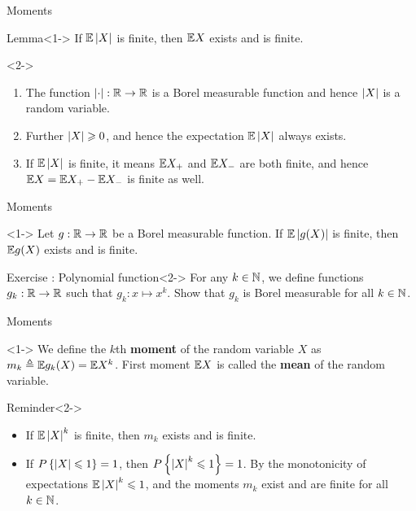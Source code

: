 \documentclass[12pt,aspectratio=169]{beamer}
\begin{document}
\begin{frame}{Moments}
\begin{block}{Lemma}<1->
If $\mathbb{E}\left\lvert X\right\rvert$ is finite, then $\mathbb{E} X$ exists and is finite. 
\end{block}
\begin{Proof}<2->
\begin{enumerate}
\item <2-> The function $\left\lvert\cdot\right\rvert: \mathbb{R} \to \mathbb{R}$ is a Borel measurable function and hence $\left\lvert X\right\rvert$ is a random variable. 
\item <3-> Further $\left\lvert X\right\rvert \geqslant 0$, and hence the expectation $\mathbb{E}\left\lvert X\right\rvert$ always exists. 
\item <4-> If $\mathbb{E}\left\lvert X\right\rvert$ is finite, it means $\mathbb{E} X_+$ and $\mathbb{E} X_-$ are both finite, 
and hence $\mathbb{E} X = \mathbb{E} X_+ - \mathbb{E} X_-$ is finite as well. 
\end{enumerate}
\end{Proof}
\end{frame}
\begin{frame}{Moments}
\begin{cor}<1->
Let $g: \mathbb{R} \to \mathbb{R}$ be a Borel measurable function. 
If $\mathbb{E}\left\lvert g(X)\right\rvert$ is finite, then $\mathbb{E} g(X)$ exists and is finite. 
\end{cor} 

\begin{block}{Exercise : Polynomial function}<2->
For any $k \in \mathbb{N}$, we define functions $g_k: \mathbb{R} \to \mathbb{R}$ such that $g_k: x \mapsto x^k$. 
Show that $g_k$ is Borel measurable for all $k \in \mathbb{N}$. 
\end{block} 
\end{frame}
\begin{frame}{Moments}
\begin{Definition}[Moments]<1->
We define the $k$th \textbf{moment} of the random variable $X$ as $m_k \triangleq \mathbb{E} g_k(X) = \mathbb{E} X^k$. 
First moment $\mathbb{E} X$ is called the \textbf{mean} of the random variable. 
\end{Definition}
\begin{block}{Reminder}<2->
\begin{itemize}
\item <2-> If $\mathbb{E}\left\lvert X\right\rvert^k$ is finite, then $m_k$ exists and is finite. 
\item <3-> If $P\left\{\left\lvert X\right\rvert \leqslant 1\right\} = 1$, then $P\left\{\left\lvert X\right\rvert^k \leqslant 1\right\} = 1$.  By the monotonicity of expectations $\mathbb{E}\left\lvert X\right\rvert^k \leqslant 1$, 
and the moments $m_k$ exist and are finite for all $k \in \mathbb{N}$. 
\end{itemize}
\end{block}
\end{frame}
\end{document}
